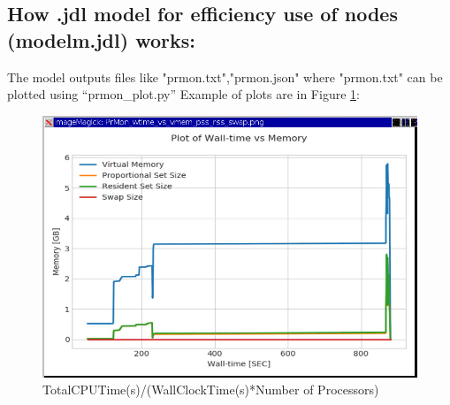 \documentclass[english]{article}
\begin{document}
\subsection{How .jdl model for efficiency use of nodes (modelm.jdl) works:}
The model outputs files like "prmon.txt","prmon.json" where "prmon.txt" can be plotted using “prmon\_plot.py”
Example of plots are in Figure \ref{fig:pr1252}:
\begin{figure}[h]
    \includegraphics[scale=0.5]{pr1252.png}
\caption{TotalCPUTime(s)/(WallClockTime(s)*Number of Processors)}
\label{fig:pr1252}
\end{figure}
\end{document}
